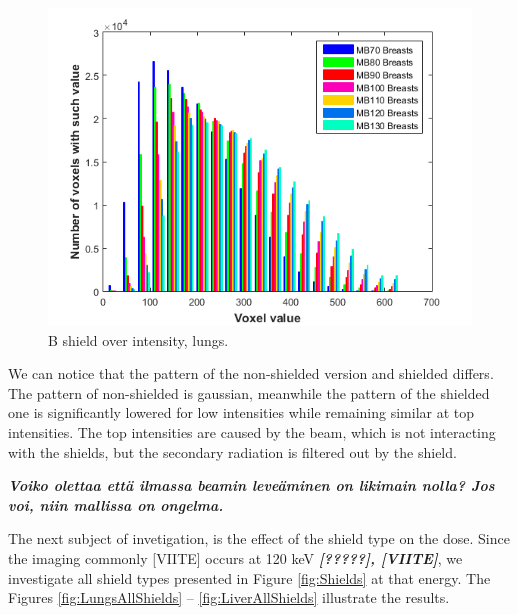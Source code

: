 \documentclass[fleqn,10pt]{SelfArx} %
\begin{document}
\begin{figure}[!htb]\centering
\includegraphics[width=\linewidth]{MBShieldBreasts}
\caption{B shield over intensity, lungs.}
\label{fig:MBShieldBreasts}
\end{figure}

We can notice that the pattern of the non-shielded version and shielded differs. The pattern of non-shielded is gaussian, meanwhile the pattern of the shielded one is significantly lowered for low intensities while remaining similar at top intensities. The top intensities are caused by the beam, which is not interacting with the shields, but the secondary radiation is filtered out by the shield.

\textbf{\textit{Voiko olettaa että ilmassa beamin leveäminen on likimain nolla? Jos voi, niin mallissa on ongelma.}}

The next subject of invetigation, is the effect of the shield type on the dose. 
Since the imaging commonly [VIITE] occurs at 120 keV \textbf{\textit{[?????], [VIITE]}}, we investigate all shield types presented in Figure \ref{fig:Shields} at that energy. The Figures \ref{fig:LungsAllShields} -- \ref{fig:LiverAllShields} illustrate the results. 
\end{document}
